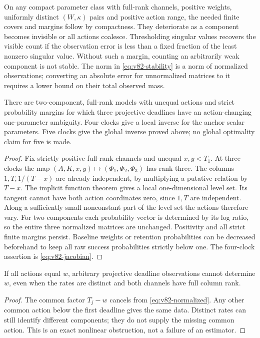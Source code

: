 On any compact parameter class with full-rank channels, positive weights,
uniformly distinct $(W,\kappa)$ pairs and positive action range, the
needed finite covers and margins follow by compactness. They deteriorate
as a component becomes invisible or all actions coalesce. Thresholding
singular values recovers the visible count if the observation error is
less than a fixed fraction of the least nonzero singular value. Without
such a margin, counting an arbitrarily weak component is not stable.
The norm in \eqref{eq:v82-stability} is a norm of normalized observations;
converting an absolute error for unnormalized matrices to it requires a
lower bound on their total observed mass.

\begin{proposition}
\label{prop:v82-three}
There are two-component, full-rank models with unequal actions and
strict probability margins for which three projective deadlines have
an action-changing one-parameter ambiguity. Four clocks give a local
inverse for the anchor scalar parameters. Five clocks give the global
inverse proved above; no global optimality claim for five is made.
\end{proposition}
\begin{proof}
Fix strictly positive full-rank channels and unequal $x,y<T_1$.
At three clocks the map $(A,K,x,y)\mapsto(\Phi_1,\Phi_2,\Phi_3)$
has rank three. The columns $1,T,1/(T-x)$ are already independent,
by multiplying a putative relation by $T-x$. The implicit function
theorem gives a local one-dimensional level set. Its tangent cannot
have both action coordinates zero, since $1,T$ are independent.
Along a sufficiently small nonconstant part of the level set the actions
therefore vary. For two components each probability vector is determined
by its log ratio, so the entire three normalized matrices are unchanged.
Positivity and all strict finite margins persist. Baseline weights or
retention probabilities can be decreased beforehand to keep all raw
success probabilities strictly below one. The four-clock assertion is
\eqref{eq:v82-jacobian}.
\end{proof}

\begin{proposition}\label{prop:v82-equal}
If all actions equal $w$, arbitrary projective deadline observations
cannot determine $w$, even when the rates are distinct and both channels
have full column rank.
\end{proposition}
\begin{proof}
The common factor $T_j-w$ cancels from \eqref{eq:v82-normalized}.
Any other common action below the first deadline gives the same data.
Distinct rates can still identify different components; they do not
supply the missing common action. This is an exact nonlinear obstruction,
not a failure of an estimator.
\end{proof}

